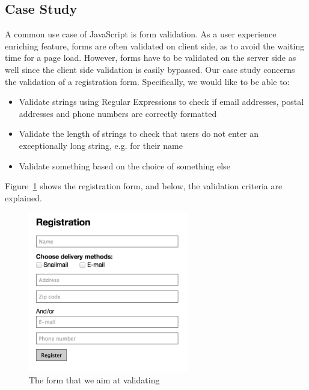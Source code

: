 	\subsection{Case Study}
		A common use case of JavaScript is form validation. As a user experience enriching feature, forms are often validated on client side, as to avoid the waiting time for a page load. However, forms have to be validated on the server side as well since the client side validation is easily bypassed. Our case study concerns the validation of a registration form. Specifically, we would like to be able to:

		\begin{itemize}
			\item Validate strings using Regular Expressions to check if email addresses, postal addresses and phone numbers are correctly formatted
			\item Validate the length of strings to check that users do not enter an exceptionally long string, e.g. for their name
			\item Validate something based on the choice of something else
		\end{itemize}

		Figure~\ref{registrationForm} shows the registration form, and below, the validation criteria are explained.

		\begin{figure}
			\begin{center}
				\centerline{\includegraphics[width=7cm]{resources/images/registrationform.png}}
			\end{center}
			\caption{The form that we aim at validating}
			\label{registrationForm}
		\end{figure}

